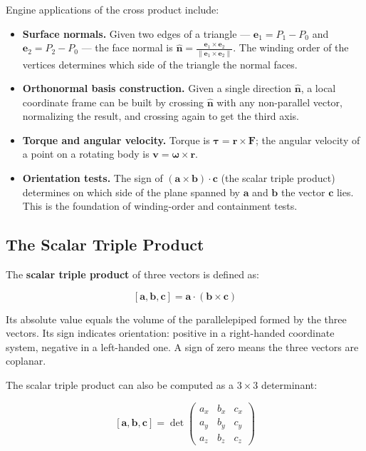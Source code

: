 \documentclass[
  11pt,
  letterpaper,
  DIV=11,
  numbers=noendperiod,
  twoside,
  open=right]{scrreprt}
\providecommand{\tightlist}{%
  \setlength{\itemsep}{0pt}\setlength{\parskip}{0pt}}
\begin{document}
Engine applications of the cross product include:

\begin{itemize}
\tightlist
\item
  \textbf{Surface normals.} Given two edges of a triangle ---
  \(\mathbf{e}_1 = P_1 - P_0\) and \(\mathbf{e}_2 = P_2 - P_0\) --- the
  face normal is
  \(\hat{\mathbf{n}} = \frac{\mathbf{e}_1 \times \mathbf{e}_2}{\|\mathbf{e}_1 \times \mathbf{e}_2\|}\).
  The winding order of the vertices determines which side of the
  triangle the normal faces.
\item
  \textbf{Orthonormal basis construction.} Given a single direction
  \(\hat{\mathbf{n}}\), a local coordinate frame can be built by
  crossing \(\hat{\mathbf{n}}\) with any non-parallel vector,
  normalizing the result, and crossing again to get the third axis.
\item
  \textbf{Torque and angular velocity.} Torque is
  \(\boldsymbol{\tau} = \mathbf{r} \times \mathbf{F}\); the angular
  velocity of a point on a rotating body is
  \(\mathbf{v} = \boldsymbol{\omega} \times \mathbf{r}\).
\item
  \textbf{Orientation tests.} The sign of
  \((\mathbf{a} \times \mathbf{b}) \cdot \mathbf{c}\) (the scalar triple
  product) determines on which side of the plane spanned by
  \(\mathbf{a}\) and \(\mathbf{b}\) the vector \(\mathbf{c}\) lies. This
  is the foundation of winding-order and containment tests.
\end{itemize}

\subsection{The Scalar Triple Product}\label{the-scalar-triple-product}

The \textbf{scalar triple product} of three vectors is defined as:

\[
[\mathbf{a}, \mathbf{b}, \mathbf{c}] = \mathbf{a} \cdot (\mathbf{b} \times \mathbf{c})
\]

Its absolute value equals the volume of the parallelepiped formed by the
three vectors. Its sign indicates orientation: positive in a
right-handed coordinate system, negative in a left-handed one. A sign of
zero means the three vectors are coplanar.

The scalar triple product can also be computed as a \(3 \times 3\)
determinant:

\[
[\mathbf{a}, \mathbf{b}, \mathbf{c}] = \det \begin{pmatrix} a_x & b_x & c_x \\ a_y & b_y & c_y \\ a_z & b_z & c_z \end{pmatrix}
\]
\end{document}
